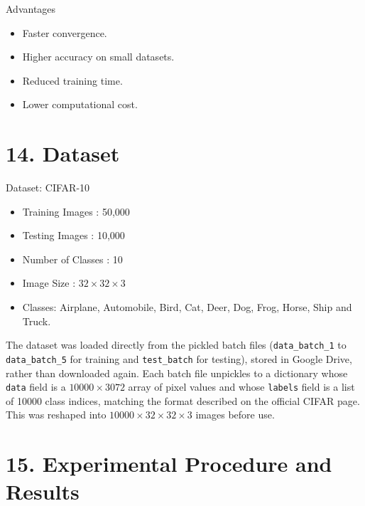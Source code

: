 \documentclass[11pt]{article}
\begin{document}
Advantages

\begin{itemize}
\item Faster convergence.
\item Higher accuracy on small datasets.
\item Reduced training time.
\item Lower computational cost.
\end{itemize}


\section*{14. Dataset}

Dataset: CIFAR-10

\begin{itemize}

\item Training Images : 50,000

\item Testing Images : 10,000

\item Number of Classes : 10

\item Image Size : $32\times32\times3$

\item Classes:
Airplane, Automobile, Bird, Cat, Deer,
Dog, Frog, Horse, Ship and Truck.

\end{itemize}

The dataset was loaded directly from the pickled batch files
(\texttt{data\_batch\_1} to \texttt{data\_batch\_5} for training and
\texttt{test\_batch} for testing), stored in Google Drive, rather than
downloaded again. Each batch file unpickles to a dictionary whose
\texttt{data} field is a $10000 \times 3072$ array of pixel values and
whose \texttt{labels} field is a list of 10000 class indices, matching the
format described on the official CIFAR page. This was reshaped into
$10000 \times 32 \times 32 \times 3$ images before use.


\section*{15. Experimental Procedure and Results}
\end{document}
